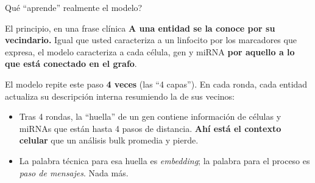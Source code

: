 
\begin{frame}{\textquestiondown{}Qu\'e ``aprende'' realmente el modelo?}
  \begin{block}{El principio, en una frase cl\'inica}
    \small
    \textbf{A una entidad se la conoce por su vecindario.} Igual que usted caracteriza a un linfocito por los marcadores que expresa, el modelo caracteriza a cada c\'elula, gen y miRNA \textbf{por aquello a lo que est\'a conectado en el grafo}.
  \end{block}

  \vspace{0.4em}

  \small
  El modelo repite este paso \textbf{4 veces} (las ``4 capas''). En cada ronda, cada entidad actualiza su descripci\'on interna resumiendo la de sus vecinos:

  \begin{center}
  \end{center}

  \vspace{0.3em}
  \begin{itemize}
    \small
    \item Tras 4 rondas, la ``huella'' de un gen contiene informaci\'on de c\'elulas y miRNAs que est\'an hasta 4 pasos de distancia. \textbf{Ah\'i est\'a el contexto celular} que un an\'alisis bulk promedia y pierde.
    \item La palabra t\'ecnica para esa huella es \emph{embedding}; la palabra para el proceso es \emph{paso de mensajes}. Nada m\'as.
  \end{itemize}
\end{frame}

